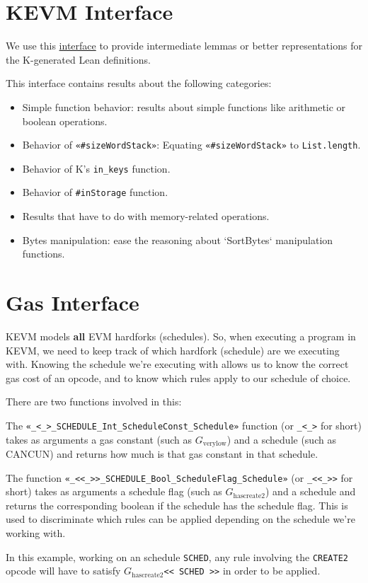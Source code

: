 \section{KEVM Interface}

We use this
\href{https://runtimeverification.github.io/evm-equivalence/docs/EvmEquivalence/Interfaces/FuncInterface.html}{interface}
to provide intermediate lemmas or better representations for the K-generated
Lean definitions.

This interface contains results about the following categories:
\begin{itemize}
\item Simple function behavior: results about simple functions like arithmetic
  or boolean operations.
\item Behavior of \texttt{«#sizeWordStack»}: Equating \texttt{«#sizeWordStack»}
  to \texttt{List.length}.
\item Behavior of K's \texttt{in_keys} function.
\item Behavior of \texttt{#inStorage} function.
\item Results that have to do with memory-related operations.
\item Bytes manipulation: ease the reasoning about `SortBytes` manipulation functions.
\end{itemize}

\section{Gas Interface}

KEVM models \textbf{all} EVM hardforks (schedules). So, when executing a program in KEVM, we
need to keep track of which hardfork (schedule) are we executing with.
Knowing the schedule we're executing with allows us to know the correct gas cost
of an opcode, and to know which rules apply to our schedule of choice.

There are two functions involved in this:
\begin{definition}[\texttt{_<_>}]\label{def:gasConstSched}\leanok
The \texttt{«_<_>_SCHEDULE_Int_ScheduleConst_Schedule»} function (or \texttt{_<_>} for
short) takes as arguments a gas constant (such as $G_{\text{verylow}}$) and a
schedule (such as CANCUN) and returns how much is that gas constant in that
schedule.
\end{definition}
\begin{definition}[\texttt{_<<_>>}]\label{def:flagConstSched}\leanok
The function \texttt{«_<<_>>_SCHEDULE_Bool_ScheduleFlag_Schedule»} (or
\texttt{_<<_>>} for short) takes as arguments a schedule flag (such as
$G_{\text{hascreate2}}$) and  a schedule and returns the corresponding boolean
if the schedule has the schedule flag. This is used to discriminate which rules
can be applied depending on the schedule we're working with.

In this example, working on an schedule \texttt{SCHED}, any rule involving the
\texttt{CREATE2} opcode will have to satisfy $G_{\text{hascreate2}}$\texttt{<<
  SCHED >>} in order to be applied.
\end{definition}

